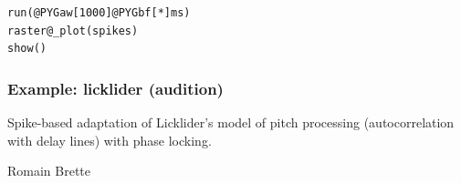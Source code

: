 \documentclass[letterpaper,10pt,english]{manual}
\begin{document}
\begin{Verbatim}[commandchars=@\[\]]
run(@PYGaw[1000]@PYGbf[*]ms)
raster@_plot(spikes)
show()
\end{Verbatim}

\resetcurrentobjects
\hypertarget{--doc-examples-audition_licklider}{}

\hypertarget{index-29}{}\subsubsection{Example: licklider (audition)}

Spike-based adaptation of Licklider's model of pitch processing (autocorrelation with
delay lines) with phase locking.

Romain Brette
\end{document}
